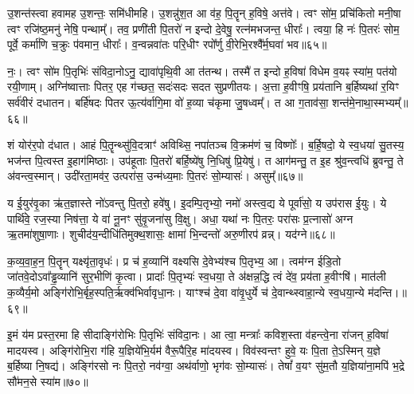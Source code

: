 उ॒शन्त॑स्त्वा हवामह उ॒शन्तः॒ समि॑धीमहि। उ॒शन्नु॑श॒त आ व॑ह॒ पि॒तॄन् ह॒विषे॒ अत्त॑वे। त्वꣳ सो॑म॒ प्रचि॑कितो मनी॒षा त्वꣳ रजि॑ष्ठ॒मनु॑ नेषि॒ पन्थाम्᳚। तव॒ प्रणी॑ती पि॒तरो॑ न इन्दो दे॒वेषु॒ रत्न॑मभजन्त॒ धीराः᳚। त्वया॒ हि नः॑ पि॒तरः॑ सोम॒ पूर्वे॒ कर्मा॑णि च॒क्रुः प॑वमान॒ धीराः᳚। व॒न्वन्नवा॑तः परि॒धीꣳ रपो᳚र्णु वी॒रेभि॒रश्वै᳚र्म॒घवा॑ भव॥६५॥

नः॒। त्वꣳ सो॑म पि॒तृभिः॑ संविदा॒नो\-ऽनु॒ द्यावा॑पृथि॒वी आ त॑तन्थ। तस्मै॑ त इन्दो ह॒विषा॑ विधेम व॒यꣴ स्या॑म॒ पत॑यो रयी॒णाम्। अग्नि॑ष्वात्ताः पितर॒ एह ग॑च्छत॒ सदः॑सदः सदत सुप्रणीतयः। अ॒त्ता ह॒वीꣳषि॒ प्रय॑तानि ब॒र्\mbox{}हिष्यथा॑ र॒यिꣳ सर्व॑वीरं दधातन। बर्\mbox{}हि॑षदः पितर ऊ॒त्य॑र्वागि॒मा वो॑ ह॒व्या च॑कृमा जु॒षध्वम्᳚। त आ ग॒ताव॑सा॒ शन्त॑मे॒नाथा॒स्मभ्यम्᳚॥६६॥

शं योर॑र॒पो द॑धात। आहं पि॒त़ॄन्थ्सु॑वि॒दत्राꣳ॑ अविथ्सि॒ नपा॑तञ्च वि॒क्रम॑णं च॒ विष्णोः᳚। ब॒र्\mbox{}हि॒षदो॒ ये स्व॒धया॑ सु॒तस्य॒ भज॑न्त पि॒त्वस्त इ॒हाग॑मिष्ठाः। उप॑हूताः पि॒तरो॑ बर्\mbox{}हि॒ष्ये॑षु नि॒धिषु॑ प्रि॒येषु॑। त आग॑मन्तु॒ त इ॒ह श्रु॑व॒न्त्वधि॑ ब्रुवन्तु॒ ते अ॑वन्त्व॒स्मान्। उदी॑रता॒मव॑र॒ उत्परा॑स॒ उन्म॑ध्य॒माः पि॒तरः॑ सो॒म्यासः॑। असुम्᳚॥६७॥

य ई॒युर॑वृ॒का ऋ॑त॒ज्ञास्ते नो॑\-ऽवन्तु पि॒तरो॒ हवे॑षु। इ॒दम्पि॒तृभ्यो॒ नमो॑ अस्त्व॒द्य ये पूर्वा॑सो॒ य उप॑रास ई॒युः। ये पार्थि॑वे॒ रज॒स्या निष॑त्ता॒ ये वा॑ नू॒नꣳ सु॑वृ॒जना॑सु वि॒क्षु। अधा॒ यथा॑ नः पि॒तरः॒ परा॑सः प्र॒त्नासो॑ अग्न ऋ॒तमा॑शुषा॒णाः। शुचीद॑य॒न्दीधि॑तिमुक्थ॒शासः॒ क्षामा॑ भि॒न्दन्तो॑ अरु॒णीरप॑ व्रन्न्। यद॑ग्ने॥६८॥

क॒व्य॒वा॒ह॒न॒ पि॒तॄन् यक्ष्यृ॑ता॒वृधः॑। प्र च॑ ह॒व्यानि॑ वक्ष्यसि दे॒वेभ्य॑श्च पि॒तृभ्य॒ आ। त्वम॑ग्न ईडि॒तो जा॑तवे॒दो\-ऽवा᳚ड्ढ॒व्यानि॑ सुर॒भीणि॑ कृ॒त्वा। प्रादाः᳚ पि॒तृभ्यः॑ स्व॒धया॒ ते अ॑क्षन्न॒द्धि त्वं दे॑व॒ प्रय॑ता ह॒वीꣳषि॑। मात॑ली क॒व्यैर्य॒मो अङ्गि॑रोभि॒र्बृह॒स्पति॒र्\mbox{}ऋक्व॑भिर्वावृधा॒नः। याꣳश्च॑ दे॒वा वा॑वृ॒धुर्ये च॑ दे॒वान्थ्स्वाहा॒न्ये स्व॒धया॒न्ये म॑दन्ति।॥६९॥

इ॒मं य॑म प्रस्त॒रमा हि सीदाङ्गि॑रोभिः पि॒तृभिः॑ संविदा॒नः। आ त्वा॒ मन्त्राः᳚ कविश॒स्ता व॑हन्त्वे॒ना रा॑जन् ह॒विषा॑ मादयस्व। अङ्गि॑रोभि॒रा ग॑हि य॒ज्ञिये॑भि॒र्यम॑ वैरू॒पैरि॒ह मा॑दयस्व। विव॑स्वन्तꣳ हुवे॒ यः पि॒ता ते॒\-ऽस्मिन् य॒ज्ञे ब॒र्\mbox{}हिष्या नि॒षद्य॑। अङ्गि॑रसो नः पि॒तरो॒ नव॑ग्वा॒ अथ॑र्वाणो॒ भृग॑वः सो॒म्यासः॑। तेषां᳚ व॒यꣳ सु॑म॒तौ य॒ज्ञिया॑ना॒मपि॑ भ॒द्रे सौ॑मन॒से स्या॑म॥७०॥


{\anuvakamend[{भ॒वा॒स्मभ्य॒मसुं॒ यद॑ग्ने मदन्ति सौमन॒स एक॑ञ्च॥12॥}]}


